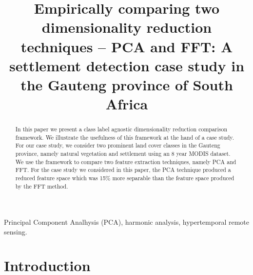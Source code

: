 \documentclass{article}
\title{Empirically comparing two dimensionality reduction techniques -- PCA and FFT: A settlement detection case study in the Gauteng province of South Africa}
\begin{document}
%
\maketitle
%
\begin{abstract}
In this paper we present a class label agnostic dimensionality reduction comparison framework. 
We illustrate the usefulness of this framework at the hand of a case study. For our case study, we consider two prominent land cover classes in the Gauteng province, namely natural vegetation and settlement using an 8 year MODIS dataset. We use the framework to compare two 
feature extraction techniques, namely PCA and FFT. For the case study we considered in this paper, the PCA technique produced a reduced feature space which was 15\% more 
separable than the feature space produced by the FFT method.
\end{abstract}
%
\begin{keywords}
Principal Component Analhysis (PCA), harmonic analysis, hypertemporal remote sensing.
\end{keywords}
%

\section{Introduction}
\label{sec:intro}
\end{document}
